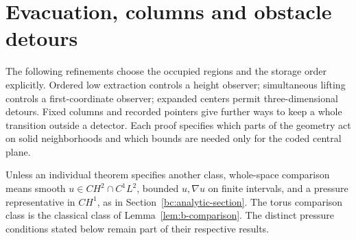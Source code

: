 \section{Evacuation, columns and obstacle detours}\label{sec:solid-routing}
The following refinements choose the occupied regions and the storage order
explicitly. Ordered low extraction controls a height observer; simultaneous
lifting controls a first-coordinate observer; expanded centers permit
three-dimensional detours. Fixed columns and recorded pointers give further
ways to keep a whole transition outside a detector. Each proof specifies
which parts of the geometry act on solid neighborhoods and which bounds
are needed only for the coded central plane.

Unless an individual theorem specifies another class, whole-space
comparison means smooth $u\in CH^2\cap C^1L^2$, bounded $u,\nabla u$
on finite intervals, and a pressure representative in $CH^1$, as in
Section~\ref{bc:analytic-section}. The torus comparison class is the
classical class of Lemma~\ref{lem:b-comparison}. The distinct pressure
conditions stated below remain part of their respective results.

